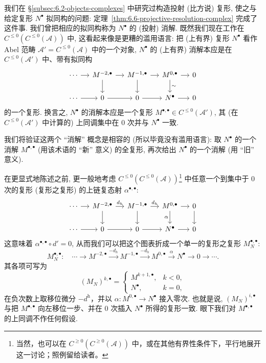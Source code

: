 我们在 \S\ref{subsec:6.2-objects-complexes} 中研究过构造投射 (比方说) 复形, 使之与给定复形 $N^\bullet$ 拟同构的问题: 定理~\ref{thm:6.6-projective-resolution-complex} 完成了这件事. 我们曾把相应的拟同构称为 $N^\bullet$ 的 (投射) 消解. 既然我们现在工作在 $C^{\le 0}(C^{\le 0}(\mathcal{A}))$ 中, 这看起来像是更糟的滥用语言: 把 (上有界) 复形 $N^\bullet$ 看作 Abel 范畴 $\mathcal{A}'=C^{\le 0}(\mathcal{A})$ 中的一个对象, $N^\bullet$ 的 (上有界) 消解本应是在 $C^{\le 0}(\mathcal{A}')$ 中、带有拟同构
\[
\begin{tikzcd}[column sep=small]
\cdots\ar[r]&M^{-2,\bullet}\ar[r]\ar[d]&M^{-1,\bullet}\ar[r]\ar[d]&M^{0,\bullet}\ar[r]\ar[d,"\sim"]&0\\
\cdots\ar[r]&0\ar[r]&0\ar[r]&N^\bullet\ar[r]&0
\end{tikzcd}
\]
的一个复形. 换言之, $N^\bullet$ 的消解本应是一个复形 $M^{\bullet,\bullet}\in C^{\le 0}(\mathcal{A}')$, 其 (在 $C^{\le 0}(\mathcal{A}')$ 中计算的) 上同调集中在 $0$ 次并与 $N^\bullet$ 一致.

我们将验证这两个 ``消解'' 概念是相容的 (所以毕竟没有滥用语言): 取 $N^\bullet$ 的一个消解 $M^{\bullet,\bullet}$ (用该术语的 ``新'' 意义) 的全复形, 再次给出 $N^\bullet$ 的一个消解 (用 ``旧'' 意义).

在更显式地陈述之前, 更一般地考虑 $C^{\le 0}(C^{\le 0}(\mathcal{A}))$\footnote{当然，也可以在 $C^{\ge 0}(C^{\ge 0}(\mathcal{A}))$ 中，或在其他有界性条件下，平行地展开这一讨论；照例留给读者。} 中任意一个到集中于 $0$ 次的复形 (复形之复形) 的上链复态射 $\alpha^{\bullet,\bullet}$:
\[
\begin{tikzcd}[column sep=small]
\cdots\ar[r]&M^{-2,\bullet}\ar[r,"d_h"]\ar[d]&M^{-1,\bullet}\ar[r,"d_h"]\ar[d]&M^{0,\bullet}\ar[r]\ar[d,"\alpha"']&0\ar[d]\\
\cdots\ar[r]&0\ar[r]&0\ar[r]&N^\bullet\ar[r]&0
\end{tikzcd}
\]
这意味着 $\alpha^{\bullet,\bullet}\circ d'=0$, 从而我们可以把这个图表折成一个单一的复形之复形 $M^{\bullet,\bullet}_{N}$:
\[
M_N^{\bullet,\bullet}:\quad\cdots\longrightarrow M^{-2,\bullet}
\xrightarrow{-d_h}M^{-1,\bullet}\xrightarrow{-d_h}M^{0,\bullet}
\xrightarrow{\alpha}N^\bullet\longrightarrow0\longrightarrow\cdots .
\]
其各项可写为
\[
(M_N)^{k,\bullet}=\begin{cases}
M^{k+1,\bullet},&k<0,\\
N^\bullet,&k=0,
\end{cases}
\]
在负次数上取移位微分 $-d^{\mathrm h}$，并以 $\alpha:M^{0,\bullet}\to N^\bullet$ 接入零次. 也就是说, $(M_N)^{i,\bullet}$ 与把 $M^{\bullet,\bullet}$ 向左移位一步、并在 $0$ 次插入 $N^\bullet$ 所得的复形一致. 眼下我们对 $M^{\bullet,\bullet}$ 的上同调不作任何假设.

